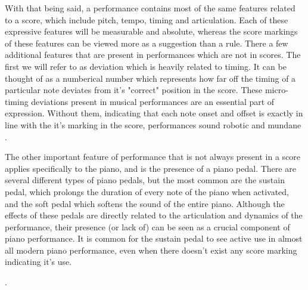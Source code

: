 With that being said, a performance contains most of the same features related to a score, which include pitch, tempo, timing and articulation. Each of these expressive features will be measurable and absolute, whereas the score markings of these features can be viewed more as a suggestion than a rule. There a few additional features that are present in performances which are not in scores. The first we will refer to as deviation which is heavily related to timing. It  can be thought of as a numberical number which represents how far off the timing of a particular note deviates from it's "correct" position in the score. These micro-timing deviations present in musical performances are an essential part of expression. Without them, indicating that each note onset and offset is exactly in line with the it's marking in the score, performances sound robotic and mundane . 

The other important feature of performance that is not always present in a score applies specifically to the piano, and is the presence of a piano pedal. There are several different types of piano pedals, but the most common are the sustain pedal, which prolongs the duration of every note of the piano when activated, and the soft pedal which softens the sound of the entire piano. Although the effects of these pedals are directly related to the articulation and dynamics of the performance, their presence (or lack of) can be seen as a crucial component of piano performance. It is common for the sustain pedal to see active use in almost all modern piano performance, even when there doesn't exist any score marking indicating it's use. 

. 

